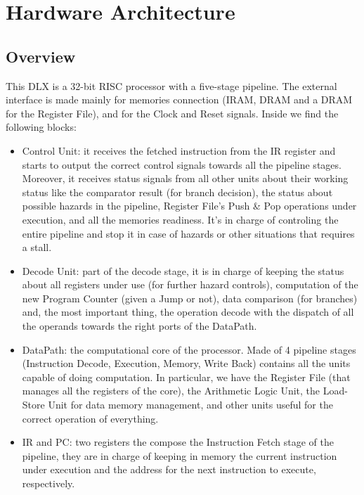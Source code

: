 
\chapter{Hardware Architecture}

\section{Overview}

This DLX is a 32-bit RISC processor with a five-stage pipeline. \newline
The external interface is made mainly for memories connection (IRAM, DRAM and a DRAM for the Register File), and for the Clock and Reset signals. Inside we find the following blocks:

\begin{itemize}
    \item Control Unit: it receives the fetched instruction from the IR register and starts to output the correct control signals towards all the pipeline stages. Moreover, it receives status signals from all other units about their working status like the comparator result (for branch decision), the status about possible hazards in the pipeline, Register File's Push \& Pop operations under execution, and all the memories readiness. It's in charge of controling the entire pipeline and stop it in case of hazards or other situations that requires a stall.
    \item Decode Unit: part of the decode stage, it is in charge of keeping the status about all registers under use (for further hazard controls), computation of the new Program Counter (given a Jump or not), data comparison (for branches) and, the most important thing, the operation decode with the dispatch of all the operands towards the right ports of the DataPath.
    \item DataPath: the computational core of the processor. Made of 4 pipeline stages (Instruction Decode, Execution, Memory, Write Back) contains all the units capable of doing computation. In particular, we have the Register File (that manages all the registers of the core), the Arithmetic Logic Unit, the Load-Store Unit for data memory management, and other units useful for the correct operation of everything.
    \item IR and PC: two registers the compose the Instruction Fetch stage of the pipeline, they are in charge of keeping in memory the current instruction under execution and the address for the next instruction to execute, respectively. 
\end{itemize}


